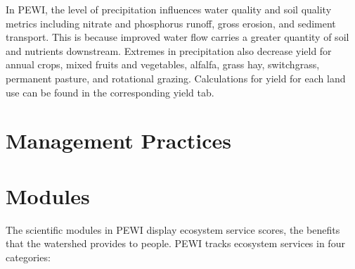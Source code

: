 \documentclass[11pt]{article}
\begin{document}
In PEWI, the level of precipitation influences water quality and soil quality metrics including nitrate and phosphorus runoff, gross erosion, and sediment transport. This is because improved water flow carries a greater quantity of soil and nutrients downstream. Extremes in precipitation also decrease yield for annual crops, mixed fruits and vegetables, alfalfa, grass hay, switchgrass, permanent pasture, and rotational grazing.\cite{33}  Calculations for yield for each land use can be found in the corresponding yield tab.


\newpage
\section{Management Practices}


\newpage
\section{Modules}
The scientific modules in PEWI display ecosystem service scores, the benefits that the watershed provides to people. PEWI tracks ecosystem services in four categories:

\cleardoublepage
\end{document}
